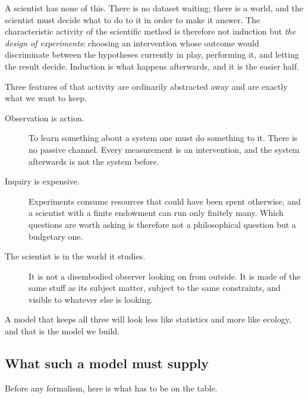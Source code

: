 \documentclass[11pt]{article}
\theoremstyle{plain}
\theoremstyle{definition}
\begin{document}
A scientist has none of this. There is no dataset waiting; there is a world, and the scientist must
decide what to do to it in order to make it answer. The characteristic activity of the scientific
method is therefore not induction but \emph{the design of experiments}: choosing an intervention whose
outcome would discriminate between the hypotheses currently in play, performing it, and letting the
result decide. Induction is what happens afterwards, and it is the easier half.

Three features of that activity are ordinarily abstracted away and are exactly what we want to keep.

\begin{description}
\item[Observation is action.] To learn something about a system one must do something to it. There is
no passive channel. Every measurement is an intervention, and the system afterwards is not the system
before.
\item[Inquiry is expensive.] Experiments consume resources that could have been spent otherwise, and a
scientist with a finite endowment can run only finitely many. Which questions are worth asking is
therefore not a philosophical question but a budgetary one.
\item[The scientist is in the world it studies.] It is not a disembodied observer looking on from
outside. It is made of the same stuff as its subject matter, subject to the same constraints, and
visible to whatever else is looking.
\end{description}

A model that keeps all three will look less like statistics and more like ecology, and that is the
model we build.

\subsection{What such a model must supply}
\label{sec:requirements}

Before any formalism, here is what has to be on the table.
\end{document}
